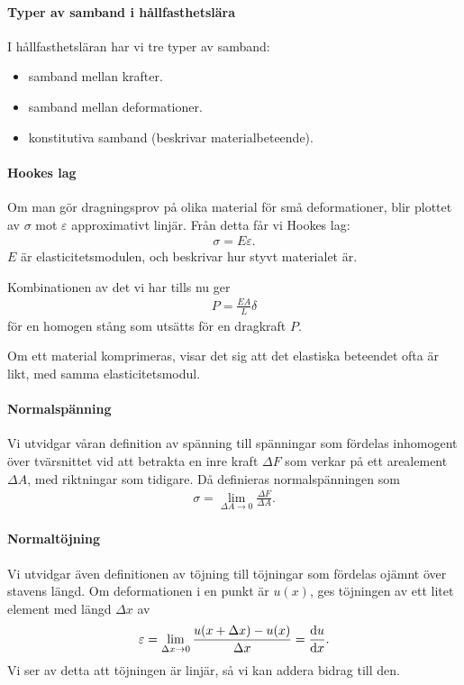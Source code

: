 \paragraph{Typer av samband i hållfasthetslära}
I hållfasthetsläran har vi tre typer av samband:
\begin{itemize}
	\item samband mellan krafter.
	\item samband mellan deformationer.
	\item konstitutiva samband (beskrivar materialbeteende).
\end{itemize}

\paragraph{Hookes lag}
Om man gör dragningsprov på olika material för små deformationer, blir plottet av $\sigma$ mot $\varepsilon$ approximativt linjär. Från detta får vi Hookes lag:
\begin{align*}
	\sigma = E\varepsilon.
\end{align*}
$E$ är elasticitetsmodulen, och beskrivar hur styvt materialet är.

Kombinationen av det vi har tills nu ger
\begin{align*}
	P = \frac{EA}{L}\delta
\end{align*}
för en homogen stång som utsätts för en dragkraft $P$.

Om ett material komprimeras, visar det sig att det elastiska beteendet ofta är likt, med samma elasticitetsmodul.

\paragraph{Normalspänning}
Vi utvidgar våran definition av spänning till spänningar som fördelas inhomogent över tvärsnittet vid att betrakta en inre kraft $\Delta F$ som verkar på ett arealement $\Delta A$, med riktningar som tidigare. Då definieras normalspänningen som
\begin{align*}
	\sigma = \lim\limits_{\Delta A\to 0}\frac{\Delta F}{\Delta A}.
\end{align*}

\paragraph{Normaltöjning}
Vi utvidgar även definitionen av töjning till töjningar som fördelas ojämnt över stavens längd. Om deformationen i en punkt är $u(x)$, ges töjningen av ett litet element med längd $\Delta x$ av
\begin{align*}
	\varepsilon = \lim\limits_{\Delta x\to 0}\frac{u(x + \Delta x) - u(x)}{\Delta x} = \dv{u}{x}.
\end{align*}
Vi ser av detta att töjningen är linjär, så vi kan addera bidrag till den.

